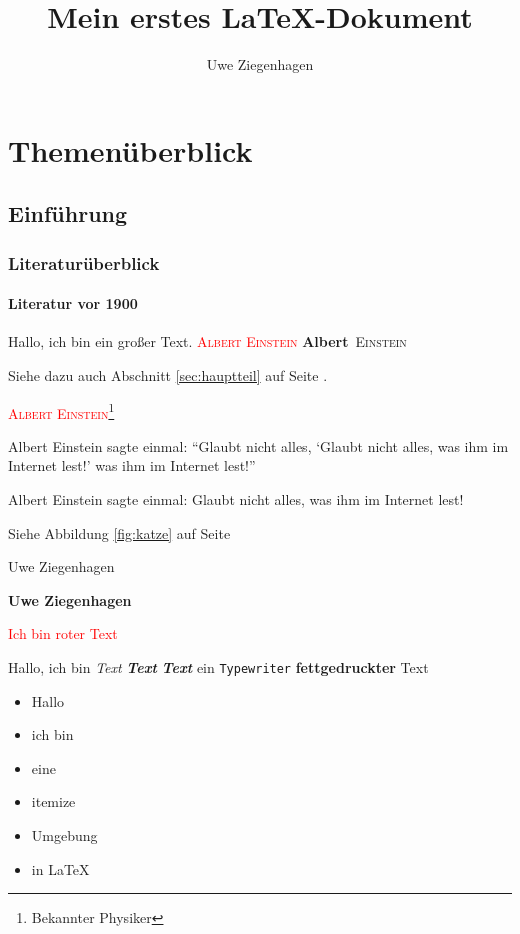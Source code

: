 \documentclass[12pt,ngerman,parskip=half]{scrreprt} %
\author{Uwe Ziegenhagen}
\title{Mein erstes \LaTeX-Dokument}
\newcommand{\person}[1]{\textcolor{red}{\textsc{#1}}}
\newcommand{\pperson}[2]{\textbf{#1}~\textsc{#2}}
\begin{document}
\maketitle

\tableofcontents

\listoffigures

\listoftables

\chapter{Themenüberblick}

\section{Einführung}
\subsection{Literaturüberblick}
\subsubsection{Literatur vor 1900}

Hallo, ich {\tiny bin} ein {\Huge großer} Text. \person{Albert Einstein} \pperson{Albert}{Einstein} 

Siehe dazu auch Abschnitt \ref{sec:hauptteil} auf Seite \pageref{sec:hauptteil}.

\person{Albert Einstein}\footnote{Bekannter Physiker}

Albert Einstein sagte einmal: \enquote{Glaubt nicht alles, \enquote{Glaubt nicht alles, was ihm im Internet lest!} was ihm im Internet lest!}

Albert Einstein sagte einmal: \glqq Glaubt nicht alles, was ihm im Internet lest!\grqq

Siehe Abbildung \ref{fig:katze}  auf Seite \pageref{fig:katze}

\textmd{Uwe Ziegenhagen}

\textbf{Uwe Ziegenhagen}

\textcolor{red}{Ich bin roter Text}

Hallo, ich bin \textit{Text} \textit{\textbf{Text}} \textbf{\textit{Text}}   ein \texttt{Typewriter} \textbf{fettgedruckter} Text

\blindtext \clearpage

\begin{itemize}
	\item Hallo
	\item ich bin
	\item eine 
	\item itemize
	\item Umgebung
	\item in LaTeX
\end{itemize}
\end{document}
